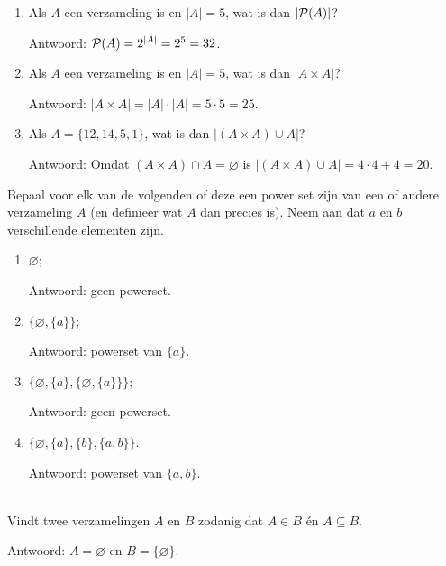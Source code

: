 \begin{answer}\mbox{} %
\begin{enumerate}[label=\textit{\alph*.}]
\item Als $A$ een verzameling is en $|A|=5$, wat is dan $|\mathcal{P}(A)|$?

Antwoord: $\mathcal{P}(A)=2^{|A|}=2^5=32$.
\item Als $A$ een verzameling is en $|A|=5$, wat is dan $|A\times A|$?

Antwoord: $|A\times A|=|A|\cdot|A|=5\cdot 5=25$.
\item Als $A=\{12,14,5,1\}$, wat is dan $|(A\times A)\cup A|$?

Antwoord: Omdat $(A\times A)\cap A=\varnothing$ is $|(A\times A)\cup A| = 4\cdot 4 + 4 = 20$.
\end{enumerate}
\end{answer}

\begin{answer} %
Bepaal voor elk van de volgenden of deze een power set zijn van een of andere verzameling $A$ (en definieer wat $A$ dan precies is). Neem aan dat $a$ en $b$ verschillende elementen zijn.
\begin{enumerate}[label=\textit{\alph*.}]
\item $\varnothing$;

Antwoord: geen powerset.
\item $\{\varnothing,\{a\}\}$;

Antwoord: powerset van $\{a\}$.
\item $\{\varnothing,\{a\},\{\varnothing,\{a\}\}\}$;

Antwoord: geen powerset.
\item $\{\varnothing,\{a\},\{b\},\{a,b\}\}$.

Antwoord: powerset van $\{a,b\}$.
\end{enumerate}
\end{answer}

\begin{answer}[Bonus]\mbox{}\\ %
Vindt twee verzamelingen $A$ en $B$ zodanig dat $A\in B$ \'en $A\subseteq B$.

\noindent Antwoord: $A=\varnothing$ en $B=\{\varnothing\}$.
\end{answer}

